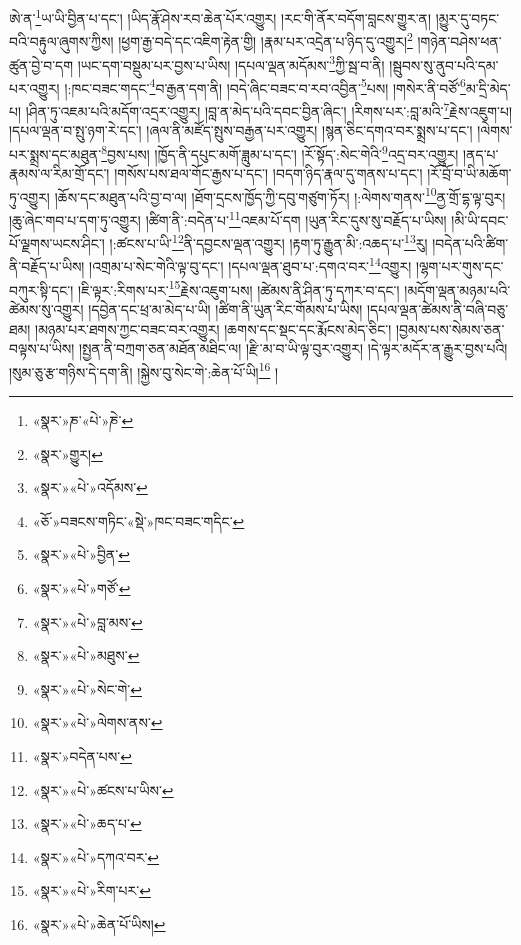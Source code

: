 \documentclass[12pt,a4paper]{book}
\begin{document}
ཨེ་ན་\footnote{«སྣར་»ཎ་«པེ་»ཎེ་}ཡ་ཡི་བྱིན་པ་དང་། །ཡིད་རྣོ་ཤེས་རབ་ཆེན་པོར་འགྱུར། །རང་གི་ནོར་བདོག་བླངས་གྱུར་ན། །མྱུར་དུ་བཏང་བའི་བརྟུལ་ཞུགས་ཀྱིས། །ཕྱག་རྒྱ་བདེ་དང་འཇིག་རྟེན་གྱི། །རྣམ་པར་འདྲེན་པ་ཉིད་དུ་འགྱུར།\footnote{«སྣར་»གྱུར།} །གཉེན་བཤེས་ཕན་ཚུན་བྱེ་བ་དག །ཡང་དག་བསྡུམ་པར་བྱས་པ་ཡིས། །དཔལ་ལྡན་མདོམས་\footnote{«སྣར་»«པེ་»འདོམས་}ཀྱི་སྦ་བ་ནི། །སྦུབས་སུ་ནུབ་པའི་དམ་པར་འགྱུར། །:ཁང་བཟང་གདང་\footnote{«ཅོ་»བཟངས་གཏིང་«སྡེ་»ཁང་བཟང་གདིང་}བ་རྒྱན་དག་ནི། །བདེ་ཞིང་བཟང་བ་རབ་འབྱིན་\footnote{«སྣར་»«པེ་»བྱིན་}པས། །གསེར་ནི་བཙོ་\footnote{«སྣར་»«པེ་»གཙོ་}མ་དྲི་མེད་པ། །ཤིན་ཏུ་འཇམ་པའི་མདོག་འདྲར་འགྱུར། །བླ་ན་མེད་པའི་དབང་བྱིན་ཞིང་། །རིགས་པར་:བླ་མའི་\footnote{«སྣར་»«པེ་»བླ་མས་}རྗེས་འཇུག་པ། །དཔལ་ལྡན་བ་སྤུ་ཉག་རེ་དང་། །ཞལ་ནི་མཛོད་སྤུས་བརྒྱན་པར་འགྱུར། །སྙན་ཅིང་དགའ་བར་སྨྲས་པ་དང་། །ལེགས་པར་སྨྲས་དང་མཐུན་\footnote{«སྣར་»«པེ་»མཐུས་}བྱས་པས། །ཁྱོད་ནི་དཔུང་མགོ་ཟླུམ་པ་དང་། །རོ་སྟོད་:སེང་གེའི་\footnote{«སྣར་»«པེ་»སེང་གེ་}འདྲ་བར་འགྱུར། །ནད་པ་རྣམས་ལ་རིམ་གྲོ་དང་། །གསོས་པས་ཐལ་གོང་རྒྱས་པ་དང་། །བདག་ཉིད་རྣལ་དུ་གནས་པ་དང་། །རོ་བྲོ་བ་ཡི་མཆོག་ཏུ་འགྱུར། །ཆོས་དང་མཐུན་པའི་བྱ་བ་ལ། །ཐོག་དྲངས་ཁྱོད་ཀྱི་དབུ་གཙུག་ཏོར། །:ལེགས་གནས་\footnote{«སྣར་»«པེ་»ལེགས་ནས་}ནྱ་གྲོ་དྷ་ལྟ་བུར། །ཆུ་ཞེང་གབ་པ་དག་ཏུ་འགྱུར། །ཚིག་ནི་:བདེན་པ་\footnote{«སྣར་»བདེན་པས་}འཇམ་པོ་དག །ཡུན་རིང་དུས་སུ་བརྗོད་པ་ཡིས། །མི་ཡི་དབང་པོ་ལྗགས་ཡངས་ཤིང་། །:ཚངས་པ་ཡི་\footnote{«སྣར་»«པེ་»ཚངས་པ་ཡིས་}ནི་དབྱངས་ལྡན་འགྱུར། །རྟག་ཏུ་རྒྱུན་མི་:འཆད་པ་\footnote{«སྣར་»«པེ་»ཆད་པ་}རུ། །བདེན་པའི་ཚིག་ནི་བརྗོད་པ་ཡིས། །འགྲམ་པ་སེང་གེའི་ལྟ་བུ་དང་། །དཔལ་ལྡན་ཐུབ་པ་:དགའ་བར་\footnote{«སྣར་»«པེ་»དཀའ་བར་}འགྱུར། །ལྷག་པར་གུས་དང་བཀུར་སྟི་དང་། །ཇི་ལྟར་:རིགས་པར་\footnote{«སྣར་»«པེ་»རིག་པར་}རྗེས་འཇུག་པས། །ཚེམས་ནི་ཤིན་ཏུ་དཀར་བ་དང་། །མདོག་ལྡན་མཉམ་པའི་ཚེམས་སུ་འགྱུར། །དབྱེན་དང་ཕྲ་མ་མེད་པ་ཡི། །ཚིག་ནི་ཡུན་རིང་གོམས་པ་ཡིས། །དཔལ་ལྡན་ཚེམས་ནི་བཞི་བཅུ་ཐམ། །མཉམ་པར་ཐགས་ཀྱང་བཟང་བར་འགྱུར། །ཆགས་དང་སྡང་དང་རྨོངས་མེད་ཅིང་། །བྱམས་པས་སེམས་ཅན་བལྟས་པ་ཡིས། །སྤྱན་ནི་བཀྲག་ཅན་མཐོན་མཐིང་ལ། །རྫི་མ་བ་ཡི་ལྟ་བུར་འགྱུར། །དེ་ལྟར་མདོར་ན་རྒྱུར་བྱས་པའི། །སུམ་ཅུ་རྩ་གཉིས་དེ་དག་ནི། །སྐྱེས་བུ་སེང་གེ་:ཆེན་པོ་ཡི།\footnote{«སྣར་»«པེ་»ཆེན་པོ་ཡིས།} །
\end{document}
